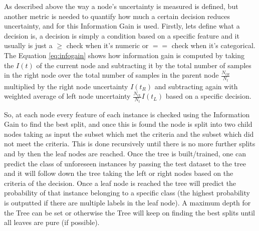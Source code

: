 \noindent As described above the way a node’s uncertainty is measured is defined, but another metric is needed to quantify how much a certain decision reduces uncertainty, and for this Information Gain is used. Firstly, lets define what a decision is, a decision is simply a condition based on a specific feature and it usually is just a $\geq$ check when it's numeric or $==$ check when it’s categorical. The Equation \eqref{eq:infogain} shows how information gain is computed by taking the $I(t)$ of the current node and subtracting it by the total number of samples in the right node over the total number of samples in the parent node \(\frac{N_{tR}}{N_t}\) multiplied by the right node uncertainty $I(t_R)$ and subtracting again with weighted average of left node uncertainty \(\frac{N_{tL}}{N_t} I(t_L) \) based on a specific decision. 

\noindent So, at each node every feature of each instance is checked using the Information Gain to find the best split, and once this is found the node is split into two child nodes taking as input the subset which met the criteria and the subset which did not meet the criteria. This is done recursively until there is no more further splits and by then the leaf nodes are reached.  Once the tree is built/trained, one can predict the class of unforeseen instances by passing the test dataset to the tree and it will follow down the tree taking the left or right nodes based on the criteria of the decision. Once a leaf node is reached the tree will predict the probability of that instance belonging to a specific class (the highest probability is outputted if there are multiple labels in the leaf node). A maximum depth for the Tree can be set or otherwise the Tree will keep on finding the best splits until all leaves are pure (if possible). 